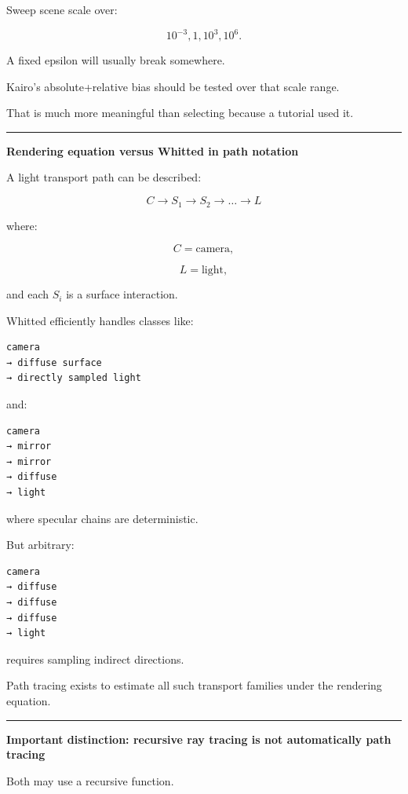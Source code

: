 Sweep scene scale over:

\[
10^{-3},
1,
10^3,
10^6.
\]

A fixed epsilon will usually break somewhere.

Kairo's absolute+relative bias should be tested over that scale range.

That is much more meaningful than selecting  because a tutorial used it.

\begin{center}\rule{0.5\linewidth}{0.5pt}\end{center}

\textbf{Rendering equation versus Whitted in path notation}

A light transport path can be described:

\[
C
\rightarrow
S_1
\rightarrow
S_2
\rightarrow
\dots
\rightarrow
L
\]

where:

\[
C=\text{camera},
\]

\[
L=\text{light},
\]

and each \(S_i\) is a surface interaction.

Whitted efficiently handles classes like:

\begin{verbatim}
camera
→ diffuse surface
→ directly sampled light
\end{verbatim}

and:

\begin{verbatim}
camera
→ mirror
→ mirror
→ diffuse
→ light
\end{verbatim}

where specular chains are deterministic.

But arbitrary:

\begin{verbatim}
camera
→ diffuse
→ diffuse
→ diffuse
→ light
\end{verbatim}

requires sampling indirect directions.

Path tracing exists to estimate all such transport families under the rendering equation.

\begin{center}\rule{0.5\linewidth}{0.5pt}\end{center}

\textbf{Important distinction: recursive ray tracing is not automatically path tracing}

Both may use a recursive function.

